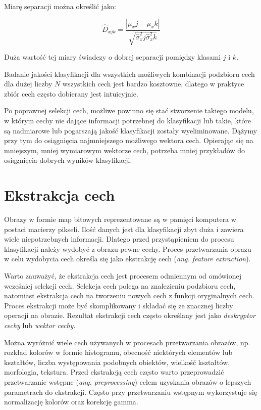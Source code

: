 Miarę separacji można określić jako:

\begin{equation}
	\hat{D}_{xjk} = \frac{|\mu_xj - \mu_xk|}{\sqrt{\hat{\sigma}^2_xj \hat{\sigma}^2_xk}}
\end{equation}

Duża wartość tej miary świadczy o dobrej separacji pomiędzy klasami $j$ i $k$.

Badanie jakości klasyfikacji dla wszystkich możliwych kombinacji podzbioru cech dla dużej liczby $N$ wszystkich cech jest bardzo kosztowne, dlatego w praktyce zbiór cech często dobierany jest intuicyjnie.\cite{STRUMIL}


Po poprawnej selekcji cech, możliwe powinno się stać stworzenie takiego modelu, w którym cechy nie dające informacji potrzebnej do klasyfikacji lub takie, które są nadmiarowe lub pogarszają jakość klasyfikacji zostały wyeliminowane. Dążymy przy tym do osiągnięcia najmniejszego możliwego wektora cech. Opierając się na mniejszym, mniej wymiarowym wektorze cech, potrzeba mniej przykładów do osiągnięcia dobrych wyników klasyfikacji.

\section{Ekstrakcja cech}

Obrazy w formie map bitowych reprezentowane są w pamięci komputera w postaci macierzy pikseli. Ilość danych jest dla klasyfikacji zbyt duża i zawiera wiele niepotrzebnych informacji. Dlatego przed przystąpieniem do procesu klasyfikacji należy wydobyć z obrazu pewne cechy. Proces przetwarzania obrazu w celu wydobycia cech określa się jako ekstrakcję cech (\emph{ang. feature extraction}).

Warto zauważyć, że ekstrakcja cech jest procesem odmiennym od omówionej wcześniej selekcji cech. Selekcja cech polega na znalezieniu podzbioru cech, natomiast ekstrakcja cech na tworzeniu nowych cech z funkcji oryginalnych cech. Proces ekstrakcji może być skomplikowany i składać się ze znacznej liczby operacji na obrazie. Rezultat ekstrakcji cech często określany jest jako \emph{deskryptor cechy} lub \emph{wektor cechy}. 

Można wyróżnić wiele cech używanych w procesach przetwarzania obrazów, np. rozkład kolorów w formie histogramu, obecność niektórych elementów lub kształtów, liczba występowania podobnych obiektów, wielkość kształtów, morfologia, tekstura. Przed ekstrakcją cech często warto przeprowadzić przetwarzanie wstępne (\emph{ang. preprocessing}) celem uzyskania obrazów o lepszych parametrach do ekstrakcji. Często przy przetwarzaniu wstępnym wykorzystuje się normalizację kolorów oraz korekcję gamma.

